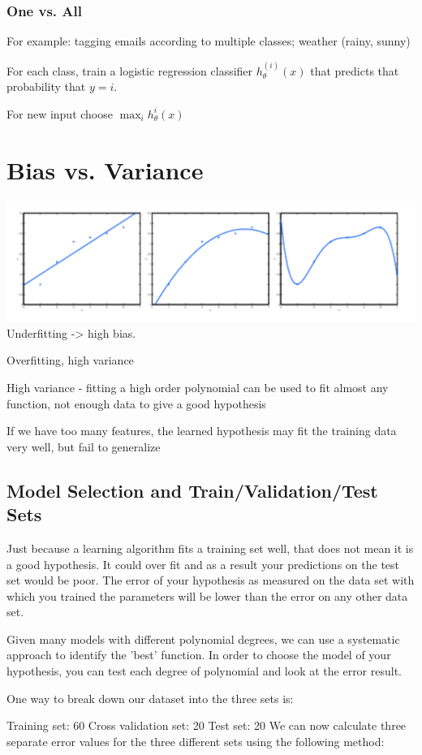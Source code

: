 \subsubsection{One vs. All}

For example: tagging emails according to multiple classes; weather (rainy, sunny)

For each class, train a logistic regression classifier $h_{\theta}^{(i)}(x)$ that predicts that probability that $y=i$.

For new input choose $\max_ih_\theta^i(x)$

\section{Bias vs. Variance}

\includegraphics[width=0.5\columnwidth]{ml_figures/overfitting.png}
Underfitting -> high bias.

Overfitting, high variance

High variance - fitting a high order polynomial can be used to fit almost any function, not enough data to give a good hypothesis

If we have too many features, the learned hypothesis may fit the training data very well, but fail to generalize

\subsection{Model Selection and Train/Validation/Test Sets}
Just because a learning algorithm fits a training set well, that does not mean it is a good hypothesis. It could over fit and as a result your predictions on the test set would be poor. The error of your hypothesis as measured on the data set with which you trained the parameters will be lower than the error on any other data set.

Given many models with different polynomial degrees, we can use a systematic approach to identify the 'best' function. In order to choose the model of your hypothesis, you can test each degree of polynomial and look at the error result.

One way to break down our dataset into the three sets is:

Training set: 60%
Cross validation set: 20%
Test set: 20%
We can now calculate three separate error values for the three different sets using the following method:

